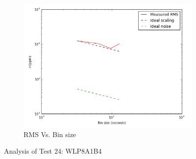 \documentclass[conference]{IEEEtran}
\begin{document}
\begin{figure}[H]
    \begin{subfigure}{3}
        \includegraphics[scale=0.6]{rms_test24}
        \caption{RMS Vs. Bin size}
    \end{subfigure}
    \caption{Analysis of Test 24: WLP8A1B4}
\end{figure}
\end{document}
